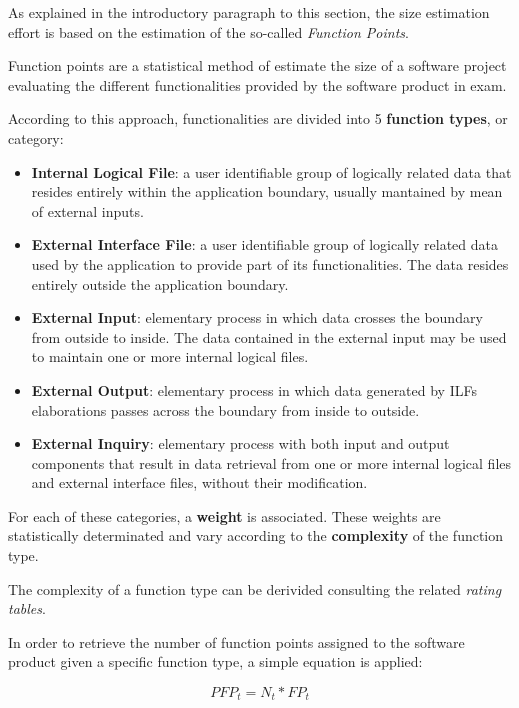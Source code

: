 As explained in the introductory paragraph to this section, the size estimation effort is based on the estimation of the so-called \textit{Function Points}.

Function points are a statistical method of estimate the size of a software project evaluating the different functionalities provided by the software product in exam.

According to this approach, functionalities are divided into 5 \textbf{function types}, or category:

\begin{itemize}
	\item \textbf{Internal Logical File}: a user identifiable group of logically related data that resides entirely within the application boundary, usually mantained by mean of external inputs.
	\item \textbf{External Interface File}: a user identifiable group of logically related data used by the application to provide part of its functionalities. The data resides entirely outside the application boundary. 
	\item \textbf{External Input}: elementary process in which data crosses the boundary from outside to inside. The data contained in the external input may be used to maintain one or more internal logical files.
	\item \textbf{External Output}: elementary process in which data generated by ILFs elaborations passes across the boundary from inside to outside.
	\item \textbf{External Inquiry}: elementary process with both input and output components that result in data retrieval from one or more internal logical files and external interface files, without their modification.
\end{itemize}

For each of these categories, a \textbf{weight} is associated. These weights are statistically determinated and vary according to the \textbf{complexity} of the function type.

The complexity of a function type can be derivided consulting the related \textit{rating tables}.

In order to retrieve the number of function points assigned to the software product given a specific function type, a simple equation is applied:

\begin{equation}
	\label{eq:PFP}
	PFP_t = N_t * FP_t
\end{equation}

